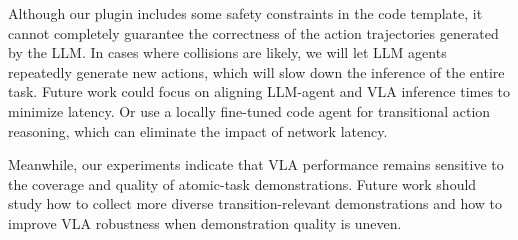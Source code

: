 \documentclass[letterpaper]{article} %
\begin{document}
Although our plugin includes some safety constraints in the code template,
it cannot completely guarantee the correctness of the action trajectories generated by the LLM.
In cases where collisions are likely, we will let LLM agents repeatedly generate new actions, which will slow down the inference of the entire task.
Future work could focus on aligning LLM-agent and VLA inference times to minimize latency. Or use a locally fine-tuned code agent for transitional action reasoning, which can eliminate the impact of network latency.

Meanwhile, our experiments indicate that VLA performance remains sensitive to the coverage and quality of atomic-task demonstrations. Future work should study how to collect more diverse transition-relevant demonstrations and how to improve VLA robustness when demonstration quality is uneven.




\end{document}
